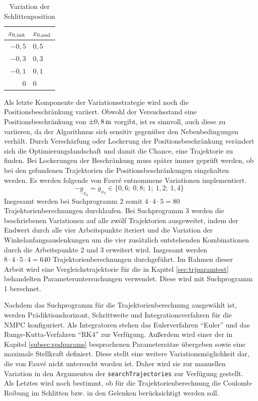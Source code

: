 \begin{table}[h]
	\centering
	\caption{Variation der Schlittenposition}
		\begin{tabular}{r|l}
			$x_{0\mathrm{,init}}$ & $x_{0\mathrm{,end}}$ \\
			\midrule
			$-0,5$ & $0,5$	\\	
			$-0,3$ & $0,3$	\\	
			$-0,1$ & $0,1$	\\	
			   $0$ &   $0$	\\
			
		\end{tabular}
	\label{tab:varpos}
\end{table}

Als letzte Komponente der Variationsstrategie wird noch die Positionsbeschränkung variiert. Obwohl der Versuchsstand eine Positionsbeschränkung von $\pm0,8\,\mathrm{m}$ vorgibt, ist es sinnvoll, auch diese zu variieren, da der Algorithmus sich sensitiv gegenüber den Nebenbedingungen verhält. Durch Verschärfung oder Lockerung der Positionsbeschränkung verändert sich die Optimierungslandschaft und damit die Chance, eine Trajektorie zu finden. Bei Lockerungen der Beschränkung muss später immer geprüft werden, ob bei den gefundenen Trajektorien die Positionsbeschränkungen eingehalten werden. Es werden folgende von Fauvé \cite{fauve} entnommene Variationen implementiert.
	\[
	-\underline{g}_{x_0} = \overline{g}_{x_0} \in \{ 0,6; \ 0,8; \ 1; \ 1,2; \ 1,4 \}  
\]
Insgesamt werden bei Suchprogramm 2 somit $4 \cdot 4 \cdot 5 = 80$ Trajektorienberechnungen durchlaufen. Bei Suchprogramm 3 werden die beschriebenen Variationen auf alle zwölf Trajektorien ausgeweitet, indem der Endwert durch alle vier Arbeitspunkte iteriert und die Variation der Winkelanfangsauslenkungen um die vier zusätzlich entstehenden Kombinationen durch die Arbeitspunkte 2 und 3 erweitert wird. Insgesamt werden $8 \cdot 4 \cdot 5 \cdot 4 = 640$ Trajektorienberechnungen durchgeführt.
Im Rahmen dieser Arbeit wird eine Vergleichstrajektorie für die in Kapitel \ref{sec:trjparamtest} behandelten Parameteruntersuchungen verwendet. Diese wird mit Suchprogramm 1 berechnet.

Nachdem das Suchprogramm für die Trajektorienberechnung ausgewählt ist, werden Prädiktionshorizont, Schrittweite und Integrationsverfahren für die NMPC konfiguriert. Als Integratoren stehen das Eulerverfahren "`Euler"' und das Runge-Kutta-Verfahren "`RK4"' zur Verfügung. Außerdem wird einer der in Kapitel \ref{subsec:spdparams} besprochenen Parametersätze übergeben sowie eine maximale Stellkraft definiert. Diese stellt eine weitere Variationsmöglichkeit dar, die von Fauvé \cite{fauve} nicht untersucht worden ist. Daher wird sie zur manuellen Variation in den Argumenten der \texttt{searchTrajectories} zur Verfügung gestellt.
Als Letztes wird noch bestimmt, ob für die Trajektorienberechnung die Coulomb-Reibung im Schlitten bzw. in den Gelenken berücksichtigt werden soll. 

